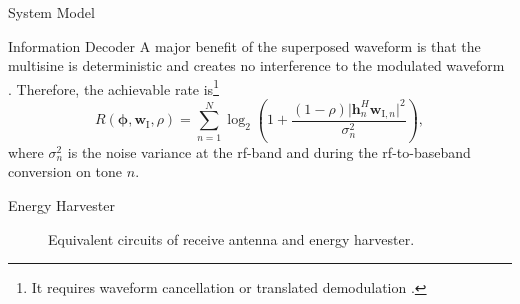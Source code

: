 \begin{section}{System Model}
	\begin{subsection}{Information Decoder}
		A major benefit of the superposed waveform is that the multisine is deterministic and creates no interference to the modulated waveform \cite{Clerckx2018b}. Therefore, the achievable rate is\footnote{It requires waveform cancellation or translated demodulation \cite{Clerckx2018b}.}
		\begin{equation}\label{eq:R}
			R(\boldsymbol{\phi},\boldsymbol{w}_{\mathrm{I}},\rho) = \sum_{n=1}^N{\log_2\left(1+\frac{(1-\rho)\lvert \boldsymbol{h}_{n}^H\boldsymbol{w}_{\mathrm{I},n} \rvert^2}{\sigma_n^2}\right)},
		\end{equation}
		where $\sigma_n^2$ is the noise variance at the \gls{rf}-band and during the \gls{rf}-to-baseband conversion on tone $n$.
	\end{subsection}


	\begin{subsection}{Energy Harvester}\label{se:energy_harvester}
		\begin{figure}[!t]
			\centering
			\caption{Equivalent circuits of receive antenna and energy harvester.}
		\end{figure}


\end{subsection}
\end{section}
